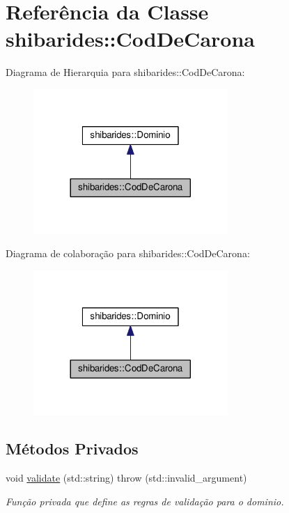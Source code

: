 \hypertarget{classshibarides_1_1CodDeCarona}{}\section{Referência da Classe shibarides\+:\+:Cod\+De\+Carona}
\label{classshibarides_1_1CodDeCarona}


Diagrama de Hierarquia para shibarides\+:\+:Cod\+De\+Carona\+:\nopagebreak
\begin{figure}[H]
\begin{center}
\leavevmode
\includegraphics[width=209pt]{classshibarides_1_1CodDeCarona__inherit__graph}
\end{center}
\end{figure}


Diagrama de colaboração para shibarides\+:\+:Cod\+De\+Carona\+:\nopagebreak
\begin{figure}[H]
\begin{center}
\leavevmode
\includegraphics[width=209pt]{classshibarides_1_1CodDeCarona__coll__graph}
\end{center}
\end{figure}
\subsection*{Métodos Privados}
\begin{DoxyCompactItemize}
\item 
void \hyperlink{classshibarides_1_1CodDeCarona_a2713cdc938576b30a6f7e59ddc67a848}{validate} (std\+::string)  throw (std\+::invalid\+\_\+argument)
\begin{DoxyCompactList}\small\item\em Função privada que define as regras de validação para o dominio. \end{DoxyCompactList}\end{DoxyCompactItemize}

